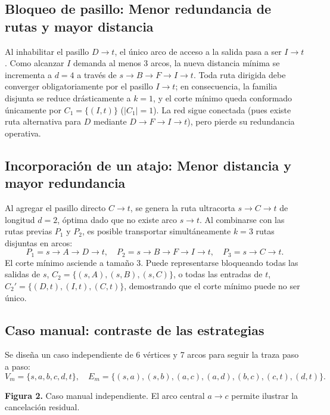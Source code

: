 \documentclass[11pt,a4paper]{article}
\newcommand{\tema}[1]{\subsection*{\color{verde}#1}}
\begin{document}
\tema{Bloqueo de pasillo: Menor redundancia de rutas y mayor distancia}
Al inhabilitar el pasillo $D \to t$, el único arco de acceso a la salida pasa a ser $I \to t$. Como alcanzar $I$ demanda al menos 3 arcos, la nueva distancia mínima se incrementa a $d=4$ a través de $s \to B \to F \to I \to t$. Toda ruta dirigida debe converger obligatoriamente por el pasillo $I \to t$; en consecuencia, la familia disjunta se reduce drásticamente a $k=1$, y el corte mínimo queda conformado únicamente por $C_1 = \{(I, t)\}$ ($|C_1|=1$). La red sigue conectada (pues existe ruta alternativa para $D$ mediante $D \to F \to I \to t$), pero pierde su redundancia operativa.

\tema{Incorporación de un atajo: Menor distancia y mayor redundancia}
Al agregar el pasillo directo $C \to t$, se genera la ruta ultracorta $s \to C \to t$ de longitud $d=2$, óptima dado que no existe arco $s \to t$. Al combinarse con las rutas previas $P_1$ y $P_2$, es posible transportar simultáneamente $k=3$ rutas disjuntas en arcos:
\[
  P_1 = s \to A \to D \to t, \quad P_2 = s \to B \to F \to I \to t, \quad P_3 = s \to C \to t.
\]
El corte mínimo asciende a tamaño 3. Puede representarse bloqueando todas las salidas de $s$, $C_2 = \{(s, A), (s, B), (s, C)\}$, o todas las entradas de $t$, $C_2' = \{(D, t), (I, t), (C, t)\}$, demostrando que el corte mínimo puede no ser único.

\subsection{Caso manual: contraste de las estrategias}
Se diseña un caso independiente de 6 vértices y 7 arcos para seguir la traza paso a paso:
\[
  V_m = \{s, a, b, c, d, t\}, \quad E_m = \{(s,a), (s,b), (a,c), (a,d), (b,c), (c,t), (d,t)\}.
\]

\begin{center}
\par
\vspace{2mm}
{\small\color{gris}\textbf{Figura 2.} Caso manual independiente. El arco central $a \to c$ permite ilustrar la cancelación residual.}
\end{center}
\end{document}

